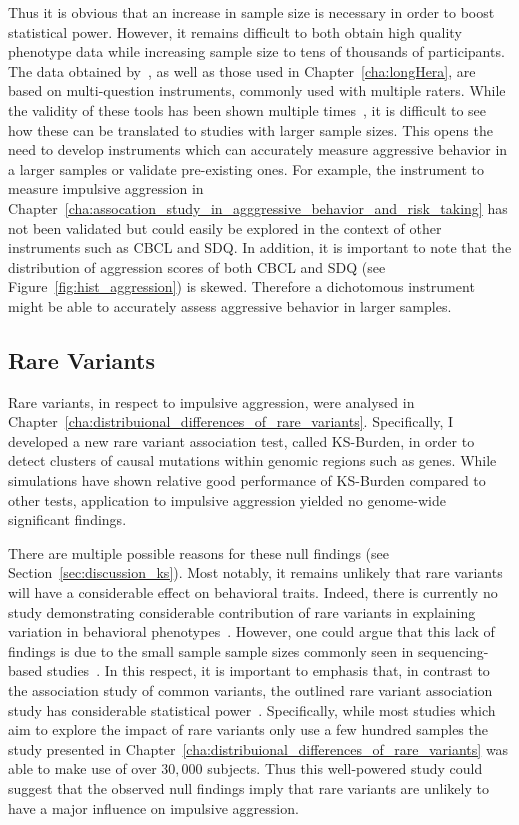 Thus it is obvious that an increase in sample size is necessary in order to boost statistical power.
However, it remains difficult to both obtain high quality phenotype data while increasing sample size to tens of thousands of participants.
The data obtained by~\citet{Pappa2016a}, as well as those used in Chapter~\ref{cha:longHera}, are based on multi-question instruments, commonly used with multiple raters.
While the validity of these tools has been shown multiple times~\cite{Goodman1997,Goodman2001,Achenbach2003}, it is difficult to see how these can be translated to studies with larger sample sizes.
This opens the need to develop instruments which can accurately measure aggressive behavior in a larger samples or validate pre-existing ones.  
For example, the  instrument to measure impulsive aggression in Chapter~\ref{cha:assocation_study_in_agggressive_behavior_and_risk_taking} has not been validated but could easily be explored in the context of other instruments such as CBCL and SDQ\@.
In addition, it is important to note that the distribution of aggression scores of both CBCL and SDQ (see Figure~\ref{fig:hist_aggression}) is skewed.
Therefore a dichotomous instrument might be able to accurately assess aggressive behavior in larger samples. 

\subsection{Rare Variants}
\label{sub:rare_variants_disccusion}

Rare variants, in respect to impulsive aggression, were analysed in Chapter~\ref{cha:distribuional_differences_of_rare_variants}.
Specifically, I developed a new rare variant association test, called KS-Burden, in order to detect clusters of causal mutations within genomic regions such as genes.
While simulations have shown relative good performance of KS-Burden compared to other tests, application to impulsive aggression yielded no genome-wide significant findings. 

There are multiple possible reasons for these null findings (see Section~\ref{sec:discussion_ks}).
Most notably, it remains unlikely that rare variants will have a considerable effect on behavioral traits.
Indeed, there is currently no study demonstrating considerable contribution of rare variants in explaining variation in behavioral phenotypes~\cite{Chabris2015}.
However, one could argue that this lack of findings is due to the small sample sample sizes commonly seen in sequencing-based studies~\cite{Lee2014}. 
In this respect, it is important to emphasis that, in contrast to the association study of common variants, the outlined rare variant association study has considerable statistical power~\cite{Lee2011}.
Specifically, while most studies which aim to explore the impact of rare variants only use a few hundred samples the study presented in Chapter~\ref{cha:distribuional_differences_of_rare_variants} was able to make use of over $30,000$ subjects. 
Thus this well-powered study could suggest that the observed  null findings imply that rare variants are unlikely to have a major influence on impulsive aggression.

